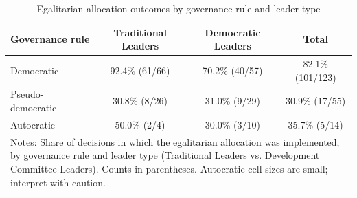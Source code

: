 \begin{table}[htbp]\centering
\caption{Egalitarian allocation outcomes by governance rule and leader type}
\begin{tabular}{lccc}
\toprule
Governance rule & Traditional Leaders & Democratic Leaders & Total \\
\midrule
Democratic & 92.4\% (61/66) & 70.2\% (40/57) & 82.1\% (101/123) \\
Pseudo-democratic & 30.8\% (8/26) & 31.0\% (9/29) & 30.9\% (17/55) \\
Autocratic & 50.0\% (2/4) & 30.0\% (3/10) & 35.7\% (5/14) \\
\bottomrule
\multicolumn{4}{p{0.9\textwidth}}{\footnotesize Notes: Share of decisions in which the egalitarian allocation was implemented, by governance rule and leader type (Traditional Leaders vs. Development Committee Leaders). Counts in parentheses. Autocratic cell sizes are small; interpret with caution.} \\
\end{tabular}
\end{table}
